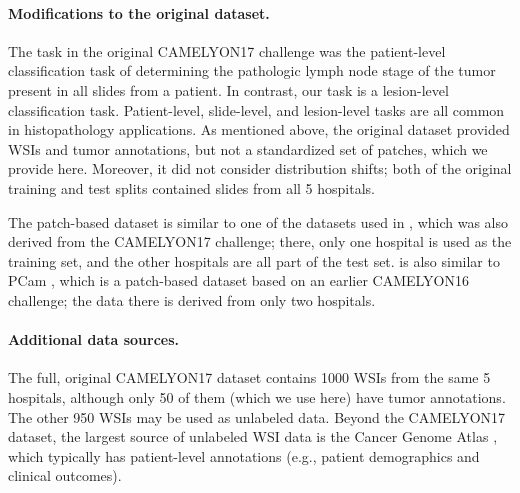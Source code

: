 \paragraph{Modifications to the original dataset.}
The task in the original CAMELYON17 challenge \citep{bandi2018detection} was the patient-level classification task of determining the pathologic lymph node stage of the tumor present in all slides from a patient. In contrast, our task is a lesion-level classification task. Patient-level, slide-level, and lesion-level tasks are all common in histopathology applications.
As mentioned above, the original dataset provided WSIs and tumor annotations,
but not a standardized set of patches, which we provide here.
Moreover, it did not consider distribution shifts; both of the original training and test splits contained slides from all 5 hospitals.

The \Camelyon patch-based dataset is similar to one of the datasets used in \citet{tellez2019quantifying}, which was also derived from the CAMELYON17 challenge; there, only one hospital is used as the training set, and the other hospitals are all part of the test set.
\Camelyon is also similar to PCam \citep{veeling2018rotation}, which is a patch-based dataset based on an earlier CAMELYON16 challenge; the data there is derived from only two hospitals.

\paragraph{Additional data sources.}
The full, original CAMELYON17 dataset contains 1000 WSIs from the same 5 hospitals, although only 50 of them (which we use here) have tumor annotations. The other 950 WSIs may be used as unlabeled data. Beyond the CAMELYON17 dataset, the largest source of unlabeled WSI data is the Cancer Genome Atlas \citep{weinstein2013cancer}, which typically has patient-level annotations (e.g., patient demographics and clinical outcomes).
